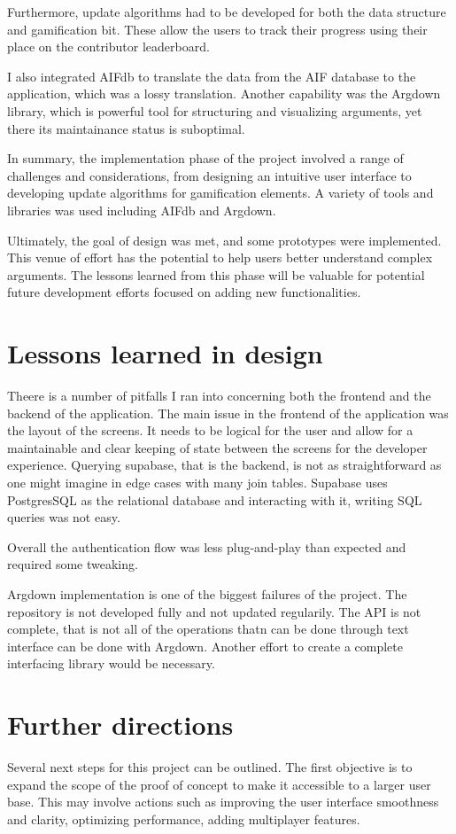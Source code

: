 \documentclass{report}
\begin{document}
{Furthermore, update algorithms had to be developed for both the data structure and gamification bit. These allow the users to track their progress using their place on the contributor leaderboard. 

I also integrated AIFdb to translate the data from the AIF database to the application, which was a lossy translation.
Another capability was the Argdown library, which is powerful tool for structuring and visualizing arguments, yet there its maintainance status is suboptimal.

In summary, the implementation phase of the project involved a range of challenges and considerations, from designing an intuitive user interface to developing update algorithms for gamification elements. A variety of tools and libraries was used including AIFdb and Argdown. 

Ultimately, the goal of design was met, and some prototypes were implemented. This venue of effort has the potential to help users better understand complex arguments. The lessons learned from this phase will be valuable for potential future development efforts focused on adding new functionalities.

\section{Lessons learned in design}
Theere is a number of pitfalls I ran into concerning both the frontend and the backend of the application. The main issue in the frontend of the application was the layout of the screens. It needs to be logical for the user and allow for a maintainable and clear keeping of state between the screens for the developer experience. Querying supabase, that is the backend, is not as straightforward as one might imagine in edge cases with many join tables. Supabase uses PostgresSQL as the relational database and interacting with it, writing SQL queries was not easy. 

Overall the authentication flow was less plug-and-play than expected and required some tweaking. 

Argdown implementation is one of the biggest failures of the project. The repository is not developed fully and not updated regularily. The API is not complete, that is not all of the operations thatn can be done through text interface can be done with Argdown. Another effort to create a complete interfacing library would be necessary.

\section{Further directions}
Several next steps for this project can be outlined. The first objective is to expand the scope of the proof of concept to make it accessible to a larger user base. This may involve actions such as improving the user interface smoothness and clarity, optimizing performance, adding multiplayer features.

}
\end{document}
